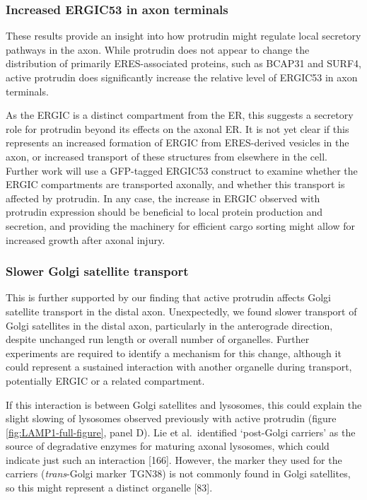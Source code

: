\documentclass[
  12pt,
  a4paper,
]{book}
\begin{document}
\subsubsection{Increased ERGIC53 in axon terminals}\label{increased-ergic53-in-axon-terminals}

These results provide an insight into how protrudin might regulate local secretory pathways in the axon. While protrudin does not appear to change the distribution of primarily ERES-associated proteins, such as BCAP31 and SURF4, active protrudin does significantly increase the relative level of ERGIC53 in axon terminals.

As the ERGIC is a distinct compartment from the ER, this suggests a secretory role for protrudin beyond its effects on the axonal ER. It is not yet clear if this represents an increased formation of ERGIC from ERES-derived vesicles in the axon, or increased transport of these structures from elsewhere in the cell. Further work will use a GFP-tagged ERGIC53 construct to examine whether the ERGIC compartments are transported axonally, and whether this transport is affected by protrudin. In any case, the increase in ERGIC observed with protrudin expression should be beneficial to local protein production and secretion, and providing the machinery for efficient cargo sorting might allow for increased growth after axonal injury.

\subsubsection{Slower Golgi satellite transport}\label{GS-discussion}

This is further supported by our finding that active protrudin affects Golgi satellite transport in the distal axon. Unexpectedly, we found slower transport of Golgi satellites in the distal axon, particularly in the anterograde direction, despite unchanged run length or overall number of organelles. Further experiments are required to identify a mechanism for this change, although it could represent a sustained interaction with another organelle during transport, potentially ERGIC or a related compartment.

If this interaction is between Golgi satellites and lysosomes, this could explain the slight slowing of lysosomes observed previously with active protrudin (figure \ref{fig:LAMP1-full-figure}, panel D). Lie et al.~identified `post-Golgi carriers' as the source of degradative enzymes for maturing axonal lysosomes, which could indicate just such an interaction {[}166{]}. However, the marker they used for the carriers (\emph{trans}-Golgi marker TGN38) is not commonly found in Golgi satellites, so this might represent a distinct organelle {[}83{]}.
\end{document}
